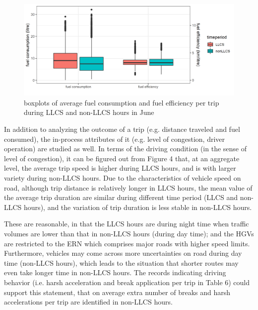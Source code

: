 \documentclass[preprint,12pt,3p]{elsarticle}
\begin{document}
\begin{figure}[H] %
\centering %
\includegraphics[scale=0.8]{fuelrelated.png} %
\caption{boxplots of average fuel consumption and fuel efficiency per trip during LLCS and non-LLCS hours in June} %
\label{fig3}
\end{figure}



In addition to analyzing the outcome of a trip (e.g. distance traveled and fuel consumed), the in-process attributes of it (e.g. level of congestion, driver operation) are studied as well. In terms of the driving condition (in the sense of level of congestion), it can be figured out from Figure 4 that, at an aggregate level, the average trip speed is higher during LLCS hours, and is with larger variety during non-LLCS hours. Due to the characteristics of vehicle speed on road, although trip distance is relatively longer in LLCS hours, the mean value of the average trip duration are similar during different time period (LLCS and non-LLCS hours), and the variation of trip duration is less stable in non-LLCS hours. 

These are reasonable, in that the LLCS hours are during night time when traffic volumes are lower than that in non-LLCS hours (during day time); and the HGVs are restricted to the ERN which comprises major roads with higher speed limits. Furthermore, vehicles may come across more uncertainties on road during day time (non-LLCS hours), which leads to the situation that shorter routes may even take longer time in non-LLCS hours. The records indicating driving behavior (i.e. harsh acceleration and break application per trip in Table 6) could support this statement, that on average extra number of breaks and harsh accelerations per trip are identified in non-LLCS hours.
\end{document}

